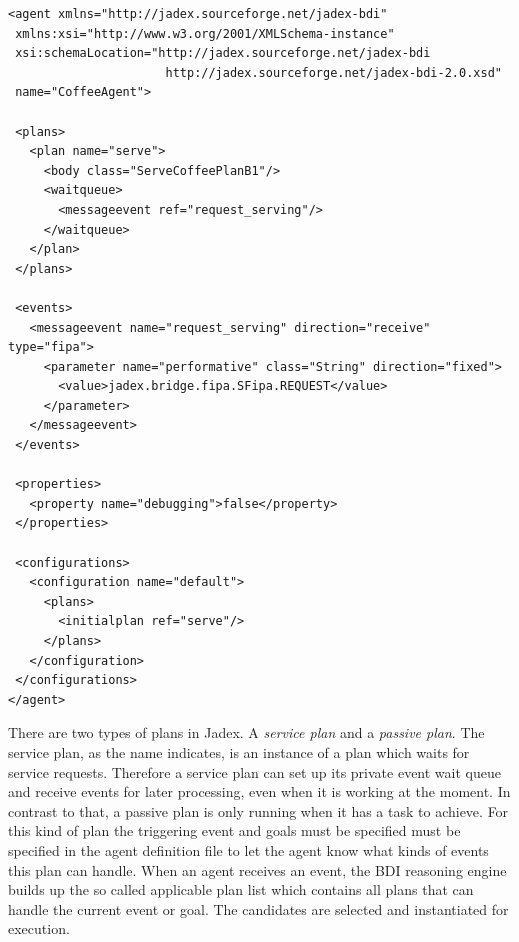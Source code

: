 \begin{lstlisting}
<agent xmlns="http://jadex.sourceforge.net/jadex-bdi"
 xmlns:xsi="http://www.w3.org/2001/XMLSchema-instance"
 xsi:schemaLocation="http://jadex.sourceforge.net/jadex-bdi
                      http://jadex.sourceforge.net/jadex-bdi-2.0.xsd"
 name="CoffeeAgent">

 <plans>
   <plan name="serve">
     <body class="ServeCoffeePlanB1"/>
     <waitqueue>
       <messageevent ref="request_serving"/>
     </waitqueue>
   </plan>
 </plans>

 <events>
   <messageevent name="request_serving" direction="receive" type="fipa">
     <parameter name="performative" class="String" direction="fixed">
       <value>jadex.bridge.fipa.SFipa.REQUEST</value>
     </parameter>
   </messageevent>
 </events>

 <properties>
   <property name="debugging">false</property>
 </properties>

 <configurations>
   <configuration name="default">
     <plans>
       <initialplan ref="serve"/>
     </plans>
   </configuration>
 </configurations>
</agent>
\end{lstlisting}
There are two types of plans in Jadex.
A \emph{service plan} and a \emph{passive plan}.
The service plan, as the name indicates, is an instance of a plan which waits for service requests.
Therefore a service plan can set up its private event wait queue and receive events for later processing, even when it is working at the moment.
In contrast to that, a passive plan is only running when it has a task to achieve.
For this kind of plan the triggering event and goals must be specified must be specified in the agent definition file to let the agent know what kinds of events this plan can handle.
When an agent receives an event, the BDI reasoning engine builds up the so called applicable plan list which contains all plans that can handle the current event or goal.
The candidates are selected and instantiated for execution.

